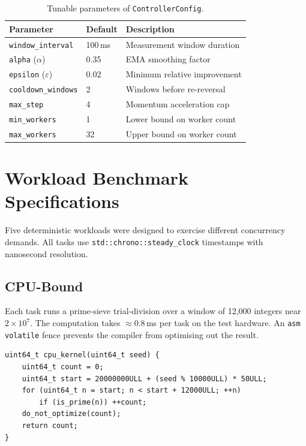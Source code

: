 \documentclass[12pt,a4paper]{article}
\begin{document}
\begin{table}[H]
\centering
\caption{Tunable parameters of \texttt{ControllerConfig}.}
\begin{tabular}{lll}
\toprule
\textbf{Parameter} & \textbf{Default} & \textbf{Description} \\
\midrule
\texttt{window\_interval} & 100\,ms & Measurement window duration \\
\texttt{alpha} ($\alpha$) & 0.35 & EMA smoothing factor \\
\texttt{epsilon} ($\varepsilon$) & 0.02 & Minimum relative improvement \\
\texttt{cooldown\_windows} & 2 & Windows before re-reversal \\
\texttt{max\_step} & 4 & Momentum acceleration cap \\
\texttt{min\_workers} & 1 & Lower bound on worker count \\
\texttt{max\_workers} & 32 & Upper bound on worker count \\
\bottomrule
\end{tabular}
\label{tab:config}
\end{table}

\section{Workload Benchmark Specifications}

Five deterministic workloads were designed to exercise different concurrency
demands.
All tasks use \texttt{std::chrono::steady\_clock} timestamps with nanosecond
resolution.

\subsection{CPU-Bound}

Each task runs a prime-sieve trial-division over a window of 12,000 integers
near $2 \times 10^7$.
The computation takes $\approx 0.8$\,ms per task on the test hardware.
An \texttt{asm volatile} fence prevents the compiler from optimising out the
result.

\begin{lstlisting}[caption={CPU kernel used for CPU-bound and mixed workloads.}]
uint64_t cpu_kernel(uint64_t seed) {
    uint64_t count = 0;
    uint64_t start = 20000000ULL + (seed % 10000ULL) * 50ULL;
    for (uint64_t n = start; n < start + 12000ULL; ++n)
        if (is_prime(n)) ++count;
    do_not_optimize(count);
    return count;
}
\end{lstlisting}
\end{document}
